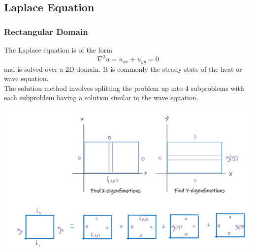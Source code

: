 \subsection{Laplace Equation}
\subsubsection{Rectangular Domain}
The Laplace equation is of the form $$\nabla^2u=u_{xx}+u_{yy}=0$$
and is solved over a 2D domain. It is commonly the steady state of the heat or wave equation.\\
The solution method involves splitting the problem up into 4 subproblems with each subproblem having a solution similar to the wave equation.\\
\begin{center}
    \includegraphics[width=14cm]{Images/PDEPictures/laplace.png}
\end{center}

